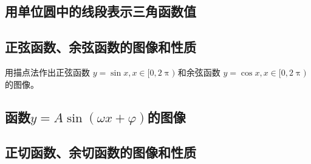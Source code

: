 \subsection{用单位圆中的线段表示三角函数值}
\begin{Practice}
  \begin{question}
    \item 
    \item 
  \end{question}
\end{Practice}

\subsection{正弦函数、余弦函数的图像和性质}
\begin{Practice}
  用描点法作出正弦函数 $y=\sin x, x\in[0,2\uppi)$ 和余弦函数 $y=\cos x, x\in[0,2\uppi)$ 的图像。
\end{Practice}

\begin{Practice}
  \begin{question}
    \item 
    \item 
    \item 
    \item 
    \item 
    \item 
    \item 
  \end{question}
\end{Practice}

\subsection{函数\texorpdfstring{$y=A\sin(\omega x+\varphi)$}{}的图像}
\begin{Practice}
  \begin{question}
    \item 
    \item 
    \item 
    \item 
  \end{question}
\end{Practice}

\subsection{正切函数、余切函数的图像和性质}
\begin{Practice}
  \begin{question}
    \item 
    \item 
    \item 
    \item 
    \item 
  \end{question}
\end{Practice}

